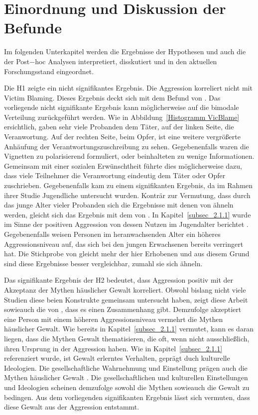 \section{Einordnung und Diskussion der Befunde}     \label{sec_5.2}
Im folgenden Unterkapitel werden die Ergebnisse der Hypothesen und auch die der Post$-$hoc Analysen interpretiert, disskutiert und in den aktuellen Forschungsstand eingeordnet.

Die H1 zeigte ein nicht signifikantes Ergebnis. Die Aggression korreliert nicht mit Victim Blaming. Dieses Ergebnis deckt sich mit dem Befund von \textcite{H1_moderation_2020}. Das vorliegende nicht signifikante Ergebnis kann möglicherweise auf die bimodale Verteilung zurückgeführt werden. Wie in Abbildung~\ref{Histogramm VicBlame} ersichtlich, gaben sehr viele Probanden dem Täter, auf der linken Seite, die Veranwortung. Auf der rechten Seite, beim Opfer, ist eine weitere vergrößerte Anhäufung der Verantwortungszuschreibung zu sehen. Gegebenenfalls waren die Vignetten zu polarisierend formuliert, oder beinhalteten zu wenige Informationen. Gemeinsam mit einer sozialen Erwünschtheit führte dies möglicherweise dazu, dass viele Teilnehmer die Veranwortung eindeutig dem Täter oder Opfer zuschrieben. Gegebenenfalls kam \textcite{H1_malasia_2012} zu einem signifikanten Ergebnis, da im Rahmen ihrer Studie Jugendliche untersucht wurden. Konträr zur Vermutung, dass durch das junge Alter vieler Probanden sich die Ergebnisse mit denen von \textcite{H1_malasia_2012} ähneln werden, gleicht sich das Ergebnis mit dem von \textcite{H1_moderation_2020}. In Kapitel~\ref{subsec_2.1.1} wurde im Sinne der positiven Aggression von dessen Nutzen im Jugendalter berichtet \parencite{Aggression}. Gegebenenfalls weisen Personen im heranwachsenden Alter ein höheres Aggressionsniveau auf, das sich bei den jungen Erwachsenen bereits verringert hat. Die Stichprobe von \textcite{H1_moderation_2020} gleicht mehr der hier Erhobenen und aus diesem Grund sind diese Ergebnisse besser vergleichbar, zumahl sie sich ähneln.

Das signifikante Ergebnis der H2 bedeutet, dass Aggression positiv mit der Akzeptanz der Mythen häuslicher Gewalt korreliert. Obwohl bislang nicht viele Studien diese beien Konstrukte gemeinsam untersucht haben, zeigt diese Arbeit sowieauch die von \textcite{H2_u_3_Bhogal_2016, H1_moderation_2020}, dass es einen Zusammenhang gibt. Demzufolge akzeptiert eine Person mit einem höheren Aggressionsniveau vermehrt die Mythen häuslicher Gewalt. Wie bereits in Kapitel~\ref{subsec_2.1.1} vermutet, kann es daran liegen, dass die Mythen Gewalt thematisieren, die oft, wenn nicht ausschließlich, ihren Ursprung in der Aggression haben. Wie \textcite{Def_Aggressivität_vs_violence} in Kapitel~\ref{subsec_2.1.1} referenziert wurde, ist Gewalt erlerntes Verhalten, geprägt duch kulturelle Ideologien. Die gesellschaftliche Wahrnehmung und Einstellung prägen auch die Mythen häuslicher Gewalt \parencite{Labelingtheory_plus, DVMAS_Peters}. Die gesellschaftlichen und kulturellen Einstellungen und Ideologien scheinen demzufolge sowohl die Mythen sowieauch die Gewalt zu bedingen. Aus dem vorliegenden signifikanten Ergebnis lässt sich vermuten, dass diese Gewalt aus der Aggression entstammt.


